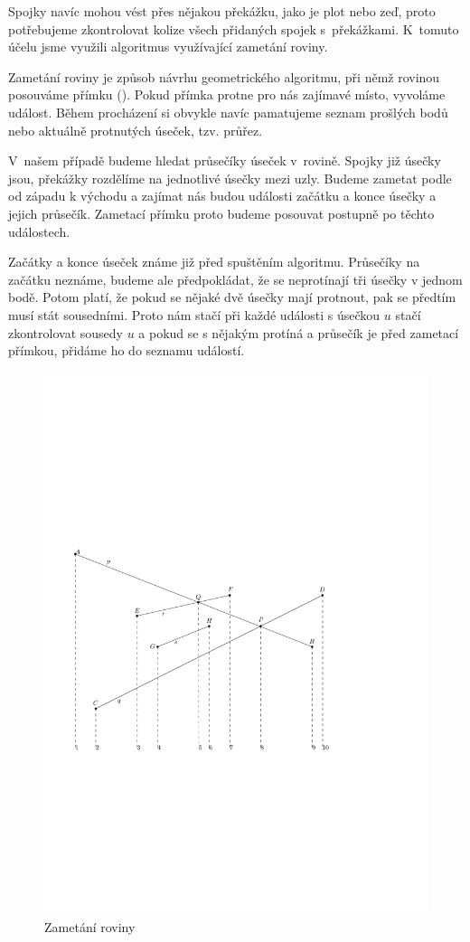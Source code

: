 Spojky navíc mohou vést přes nějakou překážku, jako je plot nebo zeď, proto
potřebujeme zkontrolovat kolize všech přidaných spojek s~překážkami. K~tomuto
účelu jsme využili algoritmus využívající zametání roviny.


{\tuc Zametání roviny}\cite{zametani} je způsob návrhu geometrického algoritmu,
při němž rovinou posouváme přímku (). Pokud přímka protne pro nás
zajímavé místo, vyvoláme událost. Během procházení si obvykle navíc pamatujeme
seznam prošlých bodů nebo aktuálně protnutých úseček, tzv. {\tuc průřez}.

V~našem případě budeme hledat průsečíky úseček v~rovině. Spojky již úsečky jsou,
překážky rozdělíme na jednotlivé úsečky mezi uzly. Budeme zametat podle od
západu k východu a zajímat nás budou události začátku a konce úsečky a jejich
průsečík. Zametací přímku proto budeme posouvat postupně po těchto událostech.

Začátky a konce úseček známe již před spuštěním algoritmu. Průsečíky na začátku
neznáme, budeme ale předpokládat, že se neprotínají tři úsečky v jednom bodě.
Potom platí, že pokud se nějaké dvě úsečky mají protnout, pak se předtím musí
stát sousedními. Proto nám stačí při každé události s úsečkou $u$ stačí
zkontrolovat sousedy $u$ a pokud se s nějakým protíná a průsečík je před
zametací přímkou, přidáme ho do seznamu událostí.

\begin{figure}[h]
	\centering
	\includegraphics{../img/zametani.pdf}
	\caption{Zametání roviny}
	\label{fig:zametani}
\end{figure}

